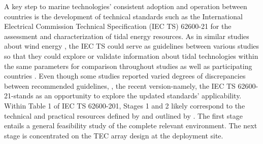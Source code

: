 \documentclass[12pt,sort&compress]{elsarticle}
\theoremstyle{definition}%
\begin{document}
A key step to marine technologies' consistent adoption and operation between countries is the development of technical standards such as the International Electrical Commission Technical Specification (IEC TS) 62600-21 for the assessment and characterization of tidal energy resources. As in similar studies about wind energy \cite{[mccaffrey_2015],[naberezhnykh_2023]}, the IEC TS could serve as guidelines between various studies so that they could explore or validate information about tidal technologies within the same parameters for comparison throughout studies as well as participating countries \cite{kilcher_tidal_2023,[deb_2025],[naberezhnykh_2023],[lieber_2024],[mcvey_2026]}. Even though some studies reported varied degrees of discrepancies between recommended guidelines, \cite{[mccaffrey_2015],[naberezhnykh_2023],[lieber_2024]}, the recent version-namely, the IEC TS 62600-21-stands as an opportunity to explore the updated standards' applicability. Within Table 1 of IEC TS 62600-201, Stages 1 and 2 likely correspond to the technical and practical resources defined by \citet{iea_2020} and outlined by \citet{nrel_2021}. The first stage entails a general feasibility study of the complete relevant environment. The next stage is concentrated on the TEC array design at the deployment site. 

\end{document}
